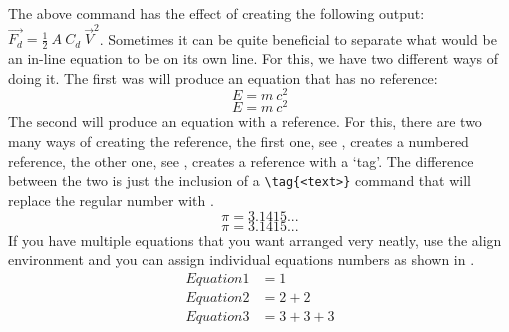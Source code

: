 		The above command has the effect of creating the following output: \(\vec{F_{d}}=\frac{1}{2}\ A\ C_{d}\ \vec{V}^{2}\).
		Sometimes it can be quite beneficial to separate what would be an in-line equation to be on its own line. 
		For this, we have two different ways of doing it. 
		The first was will produce an equation that has no reference:
		\[
			E = m\ c^2
		\] %
		\begin{equation*}
			E = m\ c^2
		\end{equation*}
		The second will produce an equation with a reference. 
		For this, there are two many ways of creating the reference, the first one, see , creates a numbered reference, the other one, see , creates a reference with a `tag'. 
		The difference between the two is just the inclusion of a \lstinline|\tag{<text>}| command that will replace the regular number with .
		\begin{equation}
			\label{eq:Eq}
			\pi = 3.1415...
		\end{equation}
		\begin{equation}
			\tag{Constant pi}
			\label{eq:customTag}
			\pi = 3.1415...
		\end{equation}
		If you have multiple equations that you want arranged very neatly, use the align environment and you can assign individual equations numbers as shown in .
		\begin{align}%
			\label{eq:multiref:a} Equation1 & = 1\\
			\label{eq:multiref:b} Equation2 & = 2 + 2\\
			\label{eq:multiref:c} Equation3 & = 3 + 3 + 3
		\end{align}
		
